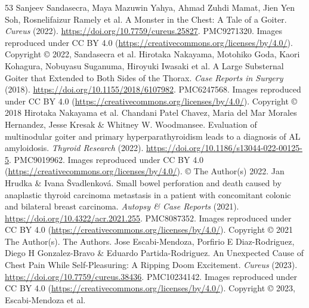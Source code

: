 \begin{thebibliography}{53}
 Sanjeev Sandasecra, Maya Mazuwin Yahya, Ahmad Zuhdi Mamat, Jien Yen Soh, Rosnelifaizur Ramely et al. A Monster in the Chest: A Tale of a Goiter. \textit{Cureus} (2022). \url{https://doi.org/10.7759/cureus.25827}. PMC9271320. Images reproduced under CC BY 4.0 (\url{https://creativecommons.org/licenses/by/4.0/}). Copyright © 2022, Sandasecra et al.
 Hirotaka Nakayama, Motohiko Goda, Kaori Kohagura, Nobuyasu Suganuma, Hiroyuki Iwasaki et al. A Large Substernal Goiter that Extended to Both Sides of the Thorax. \textit{Case Reports in Surgery} (2018). \url{https://doi.org/10.1155/2018/6107982}. PMC6247568. Images reproduced under CC BY 4.0 (\url{https://creativecommons.org/licenses/by/4.0/}). Copyright © 2018 Hirotaka Nakayama et al.
 Chandani Patel Chavez, Maria del Mar Morales Hernandez, Jesse Kresak \& Whitney W. Woodmansee. Evaluation of multinodular goiter and primary hyperparathyroidism leads to a diagnosis of AL amyloidosis. \textit{Thyroid Research} (2022). \url{https://doi.org/10.1186/s13044-022-00125-5}. PMC9019962. Images reproduced under CC BY 4.0 (\url{https://creativecommons.org/licenses/by/4.0/}). © The Author(s) 2022.
 Jan Hrudka \& Ivana Švadlenková. Small bowel perforation and death caused by anaplastic thyroid carcinoma metastasis in a patient with concomitant colonic and bilateral breast carcinoma. \textit{Autopsy \& Case Reports} (2021). \url{https://doi.org/10.4322/acr.2021.255}. PMC8087352. Images reproduced under CC BY 4.0 (\url{https://creativecommons.org/licenses/by/4.0/}). Copyright © 2021 The Author(s). The Authors.
 Jose Escabi-Mendoza, Porfirio E Diaz-Rodriguez, Diego H Gonzalez-Bravo \& Eduardo Partida-Rodriguez. An Unexpected Cause of Chest Pain While Self-Pleasuring: A Ripping Doom Excitement. \textit{Cureus} (2023). \url{https://doi.org/10.7759/cureus.38436}. PMC10234142. Images reproduced under CC BY 4.0 (\url{https://creativecommons.org/licenses/by/4.0/}). Copyright © 2023, Escabi-Mendoza et al.

\end{thebibliography}
